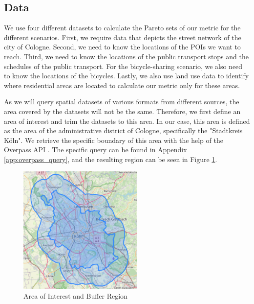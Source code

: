 \subsection{Data}
\label{subs:data}

We use four different datasets to calculate the Pareto sets of our metric for the different scenarios.
First, we require data that depicts the street network of the city of Cologne.
Second, we need to know the locations of the POIs we want to reach.
Third, we need to know the locations of the public transport stops and the schedules of the public transport.
For the bicycle-sharing scenario, we also need to know the locations of the bicycles.
Lastly, we also use land use data to identify where residential areas are located to calculate our metric only for these areas.

As we will query spatial datasets of various formats from different sources, the area covered by the datasets will not be the same.
Therefore, we first define an area of interest and trim the datasets to this area.
In our case, this area is defined as the area of the administrative district of Cologne, specifically the "Stadtkreis Köln".
We retrieve the specific boundary of this area with the help of the Overpass API .
The specific query can be found in Appendix \ref{app:overpass_query}, and the resulting region can be seen in Figure \ref{fig:area_plus_buffer}.

\begin{figure}
  \begin{center}
    \includegraphics[width=0.55\textwidth]{Figures/experiment/area_plus_buffer.png}
  \end{center}
  \caption{Area of Interest and Buffer Region}\label{fig:area_plus_buffer}
\end{figure}


